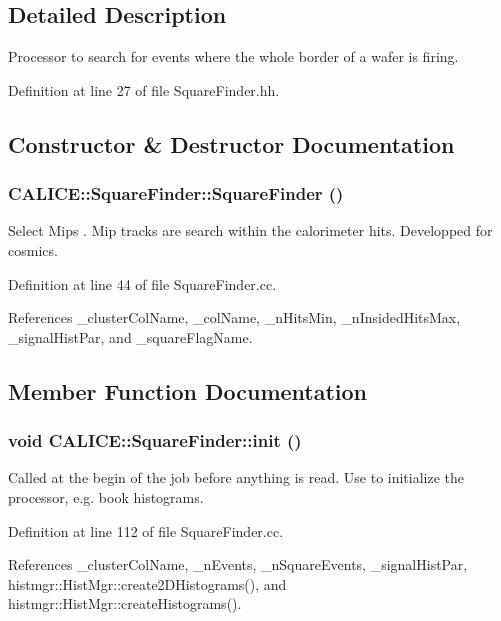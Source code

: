 \subsection{Detailed Description}
Processor to search for events where the whole border of a wafer is firing. 

Definition at line 27 of file SquareFinder.hh.

\subsection{Constructor \& Destructor Documentation}
\subsubsection[{SquareFinder}]{\setlength{\rightskip}{0pt plus 5cm}CALICE::SquareFinder::SquareFinder ()}\label{classCALICE_1_1SquareFinder_a048810eab2155fd081f4ce775c49ff11}


Select Mips . Mip tracks are search within the calorimeter hits. Developped for cosmics. 

Definition at line 44 of file SquareFinder.cc.

References \_\-clusterColName, \_\-colName, \_\-nHitsMin, \_\-nInsidedHitsMax, \_\-signalHistPar, and \_\-squareFlagName.

\subsection{Member Function Documentation}
\subsubsection[{init}]{\setlength{\rightskip}{0pt plus 5cm}void CALICE::SquareFinder::init ()}\label{classCALICE_1_1SquareFinder_aebcf72e750bcecb0304266a9a5449dba}


Called at the begin of the job before anything is read. Use to initialize the processor, e.g. book histograms. 

Definition at line 112 of file SquareFinder.cc.

References \_\-clusterColName, \_\-nEvents, \_\-nSquareEvents, \_\-signalHistPar, histmgr::HistMgr::create2DHistograms(), and histmgr::HistMgr::createHistograms().
